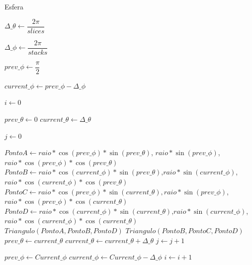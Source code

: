 \begin{landscape}
\thispagestyle{empty} %

\begin{algorithm}
\caption{Esfera}\label{alg:secc1:esfera}

\begin{center}

\begin{algorithmic}[1]
\State$\Delta\_\theta \gets \dfrac{2\pi}{slices}$

\State$\Delta\_\phi \gets \dfrac{2\pi}{stacks}$

\State$prev\_\phi \gets \dfrac{\pi}{2}$

\State$current\_\phi \gets prev\_\phi - \Delta\_\phi$


\State$i \gets 0$


\State$prev\_\theta \gets 0$
\State$current\_\theta \gets \Delta\_\theta$

\State$j \gets 0$



\State$Ponto A \gets raio*\cos(prev\_\phi) * \sin(prev\_\theta)$, $
raio*\sin(prev\_\phi)$, $raio*\cos(prev\_\phi) * \cos(prev\_\theta)$
\State$Ponto B \gets raio*\cos(current\_\phi)*\sin(prev\_\theta)$,$
 raio*\sin(current\_\phi)$,$
 raio*\cos(current\_\phi) * \cos(prev\_\theta)$
\State$Ponto C \gets raio*\cos(prev\_\phi) * 
 \sin(current\_\theta),raio*\sin(prev\_\phi)$,$
 raio*\cos(prev\_\phi) * \cos(current\_\theta)$
\State$Ponto D \gets raio*\cos(current\_\phi) *
 \sin(current\_\theta)$,$raio*\sin(current\_\phi)$,$raio*\cos(current\_\phi) *  \cos(current\_\theta)$
\newline
\State$Triangulo(Ponto A, Ponto B, Ponto D)$ 
\State$Triangulo(Ponto B, Ponto C, Ponto D)$ 
\newline
\State$prev\_\theta \gets current\_\theta$
\State$current\_\theta \gets current\_\theta + \Delta\_\theta $
\newline
\State$j \gets j + 1$ 

\EndWhile{}

\State$prev\_\phi \gets Current\_\phi$
\State$current\_\phi \gets Current\_\phi - \Delta\_\phi $
\State$i \gets i + 1$ 

\EndWhile{}

\end{algorithmic}

\end{center}

\end{algorithm}

\end{landscape}
\restoregeometry{}


